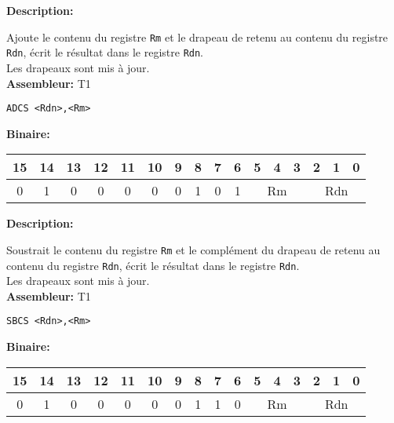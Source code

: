 \documentclass{article}
\newcounter{subsubsubsection}[subsubsection]
\begin{document}

\textbf{Description: }

Ajoute le contenu du registre \texttt{Rm} et le drapeau de retenu au contenu du registre \texttt{Rdn}, écrit le résultat dans le registre \texttt{Rdn}.\\
Les drapeaux sont mis à jour.\\

\textbf{Assembleur:} T1

\begin{lstlisting}
ADCS <Rdn>,<Rm>
\end{lstlisting}

\textbf{Binaire:}\\

\begin{tabular}{| c c c c c c c c c c c c c c c c |}
\hline
15 & 14 & 13 & 12 & 11 & 10 & \multicolumn{1}{|c}{9} & 8 & 7 & 6 & \multicolumn{1}{|c}{5} & 4 & 3 & \multicolumn{1}{|c}{2} & 1 & 0 \\
\hline
0 & 1 & 0 & 0 & 0 & 0 & \multicolumn{1}{|c}{0} & 1 & 0 & 1 & \multicolumn{3}{|c}{Rm} & \multicolumn{3}{|c|}{Rdn} \\
\hline
\end{tabular}


\textbf{Description: }

Soustrait le contenu du registre \texttt{Rm} et le complément du drapeau de retenu au contenu du registre \texttt{Rdn}, écrit le résultat dans le registre \texttt{Rdn}.\\
Les drapeaux sont mis à jour.\\

\textbf{Assembleur:} T1

\begin{lstlisting}
SBCS <Rdn>,<Rm>
\end{lstlisting}

\textbf{Binaire:}\\

\begin{tabular}{| c c c c c c c c c c c c c c c c |}
\hline
15 & 14 & 13 & 12 & 11 & 10 & \multicolumn{1}{|c}{9} & 8 & 7 & 6 & \multicolumn{1}{|c}{5} & 4 & 3 & \multicolumn{1}{|c}{2} & 1 & 0 \\
\hline
0 & 1 & 0 & 0 & 0 & 0 & \multicolumn{1}{|c}{0} & 1 & 1 & 0 & \multicolumn{3}{|c}{Rm} & \multicolumn{3}{|c|}{Rdn} \\
\hline
\end{tabular}
\end{document}
